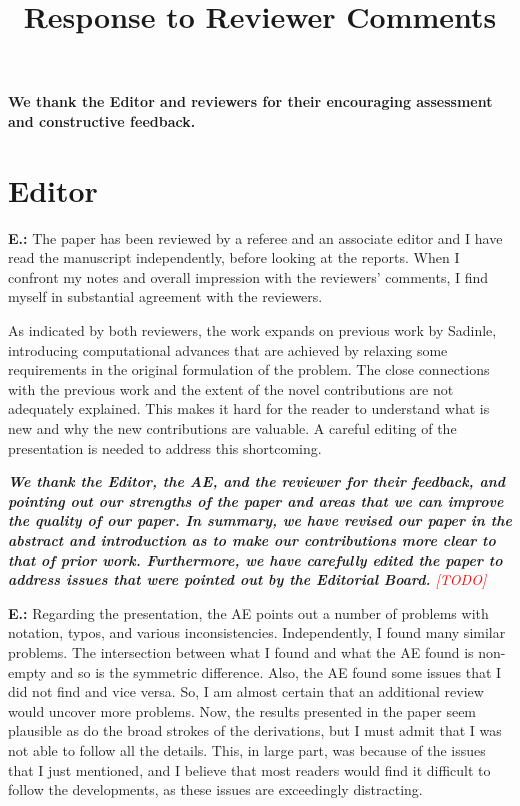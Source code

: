 \documentclass[letterpaper, parskip]{scrartcl}
\newcommand{\pointRaised}[2]{%
	\textbf{#1.\theresponsectr:} #2
}
\newcounter{responsectr}[section]     %
\newcommand{\reply}[1]{%
	\refstepcounter{responsectr}%
		\begin{tcolorbox}
			\itshape #1
		\end{tcolorbox}
}
\newcommand{\todo}{\textcolor{red}{[TODO]}\xspace}
\begin{document}

	\title{Response to Reviewer Comments}

	\maketitle
	\textbf{We thank the Editor and reviewers for their encouraging assessment and constructive
	feedback.}


	\section*{Editor}


	\pointRaised{E}{%
	The paper has been reviewed by a referee and an associate editor and I have read the manuscript independently, before looking at the reports.  When I confront my notes and overall impression with the reviewers’ comments, I find myself in substantial agreement with the reviewers.

	As indicated by both reviewers, the work expands on previous work by Sadinle, introducing computational advances that are achieved by relaxing some requirements in the original formulation of the problem.  The close connections with the previous work and the extent of the novel contributions are not adequately explained.  This makes it hard for the reader to understand what is new and why the new contributions are valuable.  A careful editing of the presentation is needed to address this shortcoming.}

	\reply{%
\textbf{We thank the Editor, the AE, and the reviewer for their feedback, and pointing out our strengths of the paper and areas that we can improve the quality of our paper. In summary, we have revised our paper in the abstract and introduction as to make our contributions more clear to that of prior work.  Furthermore, we have carefully edited the paper to address issues that were pointed out by the Editorial Board.} \todo
	}

	\newpage

	\pointRaised{E}{%
	Regarding the presentation, the AE points out a number of problems with notation, typos, and various inconsistencies.  Independently, I found many similar problems.  The intersection between what I found and what the AE found is non-empty and so is the symmetric difference.  Also, the AE found some issues that I did not find and vice versa.  So, I am almost certain that an additional review would uncover more problems.  Now, the results presented in the paper seem plausible as do the broad strokes of the derivations, but I must admit that I was not able to follow all the details. This, in large part, was because of the issues that I just mentioned, and I believe that most readers would find it difficult to follow the developments, as these issues are exceedingly distracting.
	}
	
\end{document}
